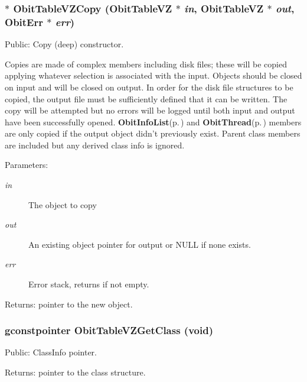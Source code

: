 \subsubsection{$\ast$ Obit\-Table\-VZCopy ({\bf Obit\-Table\-VZ} $\ast$ {\em in}, {\bf Obit\-Table\-VZ} $\ast$ {\em out}, {\bf Obit\-Err} $\ast$ {\em err})}\label{ObitTableVZ_8c_a20}


Public: Copy (deep) constructor. 

Copies are made of complex members including disk files; these will be copied applying whatever selection is associated with the input. Objects should be closed on input and will be closed on output. In order for the disk file structures to be copied, the output file must be sufficiently defined that it can be written. The copy will be attempted but no errors will be logged until both input and output have been successfully opened. {\bf Obit\-Info\-List}{\rm (p.\,\pageref{structObitInfoList})} and {\bf Obit\-Thread}{\rm (p.\,\pageref{structObitThread})} members are only copied if the output object didn't previously exist. Parent class members are included but any derived class info is ignored. \begin{Desc}
\item[Parameters:]
\begin{description}
\item[{\em in}]The object to copy \item[{\em out}]An existing object pointer for output or NULL if none exists. \item[{\em err}]Error stack, returns if not empty. \end{description}
\end{Desc}
\begin{Desc}
\item[Returns:]pointer to the new object. \end{Desc}
\subsubsection{\setlength{\rightskip}{0pt plus 5cm}gconstpointer Obit\-Table\-VZGet\-Class (void)}\label{ObitTableVZ_8c_a17}


Public: Class\-Info pointer. 

\begin{Desc}
\item[Returns:]pointer to the class structure. \end{Desc}
